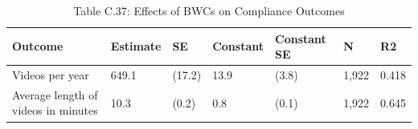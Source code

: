 \begin{table}

\caption{Table C.37: Effects of BWCs on Compliance Outcomes}
\centering
\begin{tabular}[t]{lllllll}
\toprule
Outcome & Estimate & SE & Constant & Constant SE & N & R2\\
\midrule
Videos per year & 649.1 & (17.2) & 13.9 & (3.8) & 1,922 & 0.418\\
Average length of videos in minutes & 10.3 & (0.2) & 0.8 & (0.1) & 1,922 & 0.645\\
\bottomrule
\end{tabular}
\end{table}
